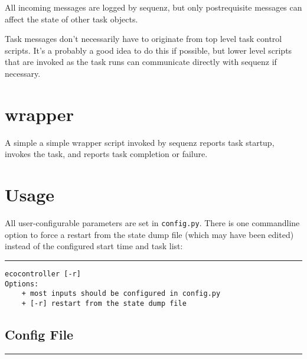 \documentclass[11pt,a4paper]{article}
\begin{document}
All incoming messages are logged by sequenz, but only postrequisite
messages can affect the state of other task objects.

Task messages don't necessarily have to originate from top level task
control scripts. It's a probably a good idea to do this if possible, but
lower level scripts that are invoked as the task runs can communicate
directly with sequenz if necessary.

\section{wrapper}

A simple a simple wrapper script invoked by sequenz reports task
startup, invokes the task, and reports task completion or failure. 


\label{usage}
\section{Usage}

All user-configurable parameters are set in \verb#config.py#. There is
one commandline option to force a restart from the state dump file
(which may have been edited) instead of the configured start time and
task list:

\lstset{language=sh}

{\small

\noindent
\rule{5cm}{.2mm}
\begin{lstlisting}
ecocontroller [-r]
Options:
    + most inputs should be configured in config.py
    + [-r] restart from the state dump file
\end{lstlisting}
}

\lstset{language=Python}

\subsection{Config File}

{\small
\noindent
\rule{5cm}{.2mm}

}
\end{document}
